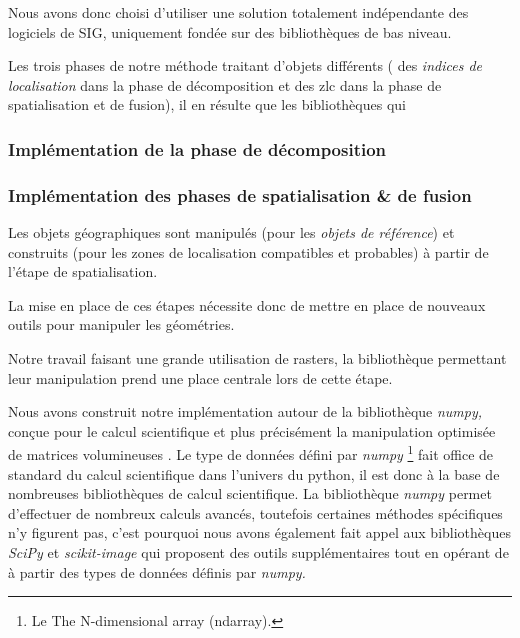 Nous avons donc choisi d'utiliser une solution totalement indépendante
des logiciels de SIG, uniquement fondée sur des bibliothèques de bas
niveau.


Les trois phases de notre méthode traitant d'objets différents (\ie
des \emph{indices de localisation} dans la phase de décomposition et
des \ac{zlc} dans la phase de spatialisation et de fusion), il en
résulte que les bibliothèques qui 

\subsubsection{Implémentation de la phase de décomposition}



\subsubsection{Implémentation des phases de spatialisation \& de fusion}

Les objets géographiques sont manipulés (pour les \emph{objets de
  référence}) et construits (pour les zones de localisation
compatibles et probables) à partir de l'étape de spatialisation.

La mise en place de ces étapes nécessite donc de mettre en place de
nouveaux outils pour manipuler les géométries.

Notre travail faisant une grande utilisation de rasters, la
bibliothèque permettant leur manipulation prend une place centrale
lors de cette étape.

Nous avons construit notre implémentation autour de la bibliothèque
\emph{numpy,} conçue pour le calcul scientifique et plus précisément
la manipulation optimisée de matrices volumineuses
\autocite{vanderWalt2011}. Le type de données défini par \emph{numpy}
\footnote{Le The N-dimensional array (ndarray).} fait office de
standard du calcul scientifique dans l'univers du python, il est donc
à la base de nombreuses bibliothèques de calcul scientifique.  La
bibliothèque \emph{numpy} permet d'effectuer de nombreux calculs
avancés, toutefois certaines méthodes spécifiques n'y figurent pas,
c'est pourquoi nous avons également fait appel aux bibliothèques
\emph{SciPy} et \emph{scikit-image}
\autocite{vanderWalt2014,Virtanen2020} qui proposent des outils
supplémentaires tout en opérant de à partir des types de données
définis par \emph{numpy.}




